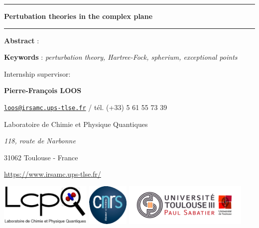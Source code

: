 \documentclass[11pt,a4paper]{article}
\begin{document}
\begin{center}

\vspace{1.5cm}

\rule[11pt]{5cm}{0.5pt}

\textbf{\huge Pertubation theories in the complex plane}

\rule{5cm}{0.5pt}

\vspace{1.5cm}

\parbox{15cm}{\small
\textbf{Abstract} : \it 
}

\parbox{15cm}{
\textbf{Keywords} : \it perturbation theory, Hartree-Fock, spherium, exceptional points
} %

\vspace{0.5cm}

\parbox{15cm}{
Internship supervisor:

{\bf Pierre-François \textsc{LOOS}}

\href{mailto:loos@irsamc.ups-tlse.fr}{\tt loos@irsamc.ups-tlse.fr} / tél. (+33) 5 61 55 73 39

Laboratoire de Chimie et Physique Quantiques

{\it 118, route de Narbonne

31062 Toulouse - France}

\url{https://www.irsamc.ups-tlse.fr/}
} %

\vspace{0.5cm}
\includegraphics[height=2cm]{LCPQ_logo.pdf} \hfill \includegraphics[height=2cm]{LogoCNRS.eps} \hfill \includegraphics[height=2cm]{UPS_logo.jpg}

\end{center}
\end{document}
